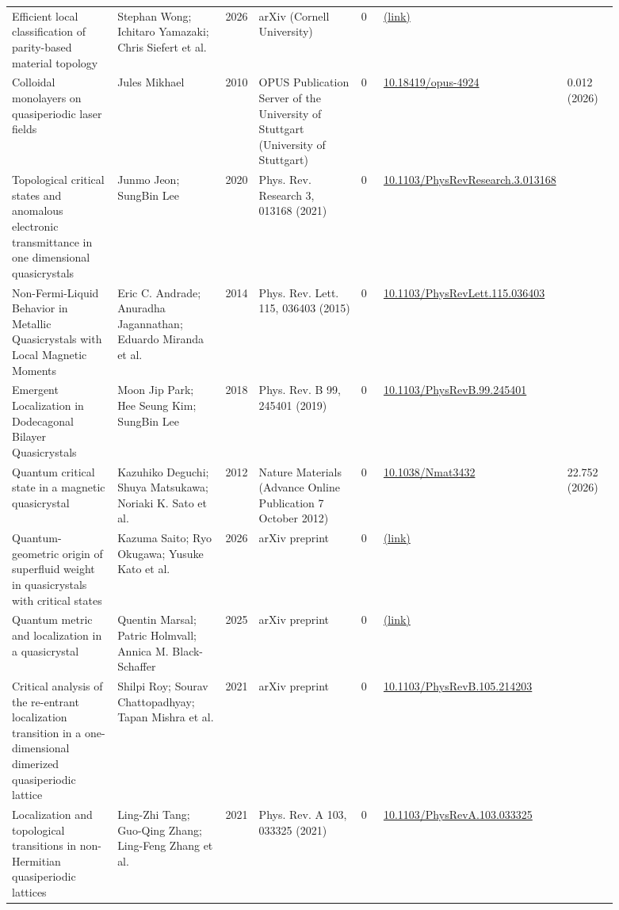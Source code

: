 \documentclass[10pt,a4paper]{article}
\begin{document}
{\begin{longtable}{p{0.192\linewidth}p{0.192\linewidth}p{0.043\linewidth}p{0.192\linewidth}p{0.043\linewidth}p{0.132\linewidth}p{0.096\linewidth}}
Efficient local classification of parity-based material topology & Stephan Wong; Ichitaro Yamazaki; Chris Siefert et al. & 2026 & arXiv (Cornell University) & 0 & \href{https://openalex.org/W7125351703}{(link)} &  \\
Colloidal monolayers on quasiperiodic laser fields & Jules Mikhael & 2010 & OPUS Publication Server of the University of Stuttgart (University of Stuttgart) & 0 & \href{https://doi.org/10.18419/opus-4924}{10.18419/opus-4924} & 0.012 (2026) \\
Topological critical states and anomalous electronic transmittance in one dimensional quasicrystals & Junmo Jeon; SungBin Lee & 2020 & Phys. Rev. Research 3, 013168 (2021) & 0 & \href{https://doi.org/10.1103/PhysRevResearch.3.013168}{10.1103/PhysRevResearch.3.013168} &  \\
Non-Fermi-Liquid Behavior in Metallic Quasicrystals with Local Magnetic Moments & Eric C. Andrade; Anuradha Jagannathan; Eduardo Miranda et al. & 2014 & Phys. Rev. Lett. 115, 036403 (2015) & 0 & \href{https://doi.org/10.1103/PhysRevLett.115.036403}{10.1103/PhysRevLett.115.036403} &  \\
Emergent Localization in Dodecagonal Bilayer Quasicrystals & Moon Jip Park; Hee Seung Kim; SungBin Lee & 2018 & Phys. Rev. B 99, 245401 (2019) & 0 & \href{https://doi.org/10.1103/PhysRevB.99.245401}{10.1103/PhysRevB.99.245401} &  \\
Quantum critical state in a magnetic quasicrystal & Kazuhiko Deguchi; Shuya Matsukawa; Noriaki K. Sato et al. & 2012 & Nature Materials (Advance Online Publication 7 October 2012) & 0 & \href{https://doi.org/10.1038/Nmat3432}{10.1038/Nmat3432} & 22.752 (2026) \\
Quantum-geometric origin of superfluid weight in quasicrystals with critical states & Kazuma Saito; Ryo Okugawa; Yusuke Kato et al. & 2026 & arXiv preprint & 0 & \href{http://arxiv.org/abs/2606.09989v1}{(link)} &  \\
Quantum metric and localization in a quasicrystal & Quentin Marsal; Patric Holmvall; Annica M. Black-Schaffer & 2025 & arXiv preprint & 0 & \href{http://arxiv.org/abs/2506.15575v3}{(link)} &  \\
Critical analysis of the re-entrant localization transition in a one-dimensional dimerized quasiperiodic lattice & Shilpi Roy; Sourav Chattopadhyay; Tapan Mishra et al. & 2021 & arXiv preprint & 0 & \href{https://doi.org/10.1103/PhysRevB.105.214203}{10.1103/PhysRevB.105.214203} &  \\
Localization and topological transitions in non-Hermitian quasiperiodic lattices & Ling-Zhi Tang; Guo-Qing Zhang; Ling-Feng Zhang et al. & 2021 & Phys. Rev. A 103, 033325 (2021) & 0 & \href{https://doi.org/10.1103/PhysRevA.103.033325}{10.1103/PhysRevA.103.033325} &  \\

\end{longtable}}
\end{document}

